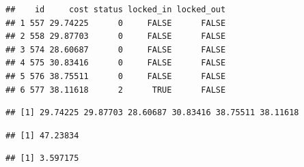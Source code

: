 \documentclass[12pt,]{book}
\newenvironment{Shaded}{\begin{snugshade}}{\end{snugshade}}
\newcommand{\KeywordTok}[1]{\textcolor[rgb]{0.13,0.29,0.53}{\textbf{#1}}}
\newcommand{\CommentTok}[1]{\textcolor[rgb]{0.56,0.35,0.01}{\textit{#1}}}
\newcommand{\OperatorTok}[1]{\textcolor[rgb]{0.81,0.36,0.00}{\textbf{#1}}}
\newcommand{\NormalTok}[1]{#1}
\begin{document}
\begin{verbatim}
##    id     cost status locked_in locked_out
## 1 557 29.74225      0     FALSE      FALSE
## 2 558 29.87703      0     FALSE      FALSE
## 3 574 28.60687      0     FALSE      FALSE
## 4 575 30.83416      0     FALSE      FALSE
## 5 576 38.75511      0     FALSE      FALSE
## 6 577 38.11618      2      TRUE      FALSE
\end{verbatim}

\begin{Shaded}
\end{Shaded}

\begin{verbatim}
## [1] 29.74225 29.87703 28.60687 30.83416 38.75511 38.11618
\end{verbatim}

\begin{Shaded}
\end{Shaded}

\begin{verbatim}
## [1] 47.23834
\end{verbatim}

\begin{Shaded}
\end{Shaded}

\begin{verbatim}
## [1] 3.597175
\end{verbatim}

\begin{Shaded}
\end{Shaded}
\end{document}
